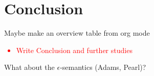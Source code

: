 \documentclass{article}
\theoremstyle{definition}
\newcommand\todo[1]{\textcolor{red}{#1}}
\begin{document}
\section{Conclusion}
Maybe make an overview table from org mode
\todo{
  \begin{itemize}
    \item Write Conclusion and further studies
  \end{itemize}
}
What about the $\epsilon$-semantics (Adams, Pearl)? 

\nocite{hamblin59_modal_probab,holliday13_measur,harrison-trainor17_prefer,kratzer91_modal,lassiter10_gradab,yalcin10_probab_operat,kratzer98_seman}
 \printbibliography
\end{document}
